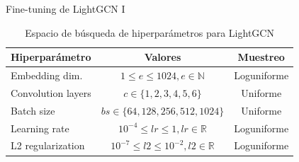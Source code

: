 \begin{frame}{Fine-tuning de LightGCN I}
\begin{table}[]
    \centering
    \begin{tabular}{l|c|c}
\textbf{Hiperparámetro} & \textbf{Valores} & \textbf{Muestreo} \\
\hline
Embedding dim. & $1\leq e\leq 1024, e\in \mathbb{N}$ & Loguniforme \\
Convolution layers & $c\in \{1,2,3,4,5,6\}$ & Uniforme \\
Batch size & $bs\in\{64,128,256,512,1024\}$ & Uniforme \\
Learning rate & $10^{-4}\leq lr\leq 1, lr\in \mathbb{R}$ & Loguniforme \\
L2 regularization & $10^{-7}\leq l2 \leq 10^{-2}, l2 \in \mathbb{R}$ & Loguniforme \\
    \end{tabular}
    \caption{Espacio de búsqueda de hiperparámetros para LightGCN}
\end{table}
\end{frame}

